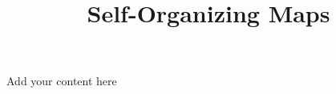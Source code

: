 \title{Self-Organizing Maps}
\label{chp:self-organizing-maps}
\author{}
\institute{}
\maketitle


Add your content here




